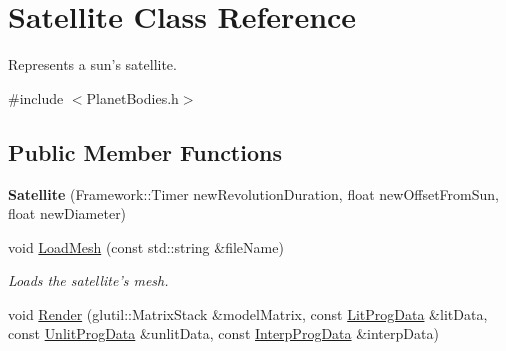 \hypertarget{class_satellite}{\section{Satellite Class Reference}
\label{class_satellite}
}


Represents a sun's satellite.  




{\ttfamily \#include $<$Planet\-Bodies.\-h$>$}

\subsection*{Public Member Functions}
\begin{DoxyCompactItemize}
\item 
\hypertarget{class_satellite_a40c1e6e97b4c8447e7d92b46226a852c}{{\bfseries Satellite} (Framework\-::\-Timer new\-Revolution\-Duration, float new\-Offset\-From\-Sun, float new\-Diameter)}\label{class_satellite_a40c1e6e97b4c8447e7d92b46226a852c}

\item 
\hypertarget{class_satellite_a810947406b5df21450b07a6f9250d83e}{void \hyperlink{class_satellite_a810947406b5df21450b07a6f9250d83e}{Load\-Mesh} (const std\-::string \&file\-Name)}\label{class_satellite_a810947406b5df21450b07a6f9250d83e}

\begin{DoxyCompactList}\small\item\em Loads the satellite's mesh. \end{DoxyCompactList}\item 
\hypertarget{class_satellite_acddaeaf0886cdf9f4d8bae100e05d558}{void \hyperlink{class_satellite_acddaeaf0886cdf9f4d8bae100e05d558}{Render} (glutil\-::\-Matrix\-Stack \&model\-Matrix, const \hyperlink{struct_lit_prog_data}{Lit\-Prog\-Data} \&lit\-Data, const \hyperlink{struct_unlit_prog_data}{Unlit\-Prog\-Data} \&unlit\-Data, const \hyperlink{struct_interp_prog_data}{Interp\-Prog\-Data} \&interp\-Data)}\label{class_satellite_acddaeaf0886cdf9f4d8bae100e05d558}


\end{DoxyCompactItemize}
